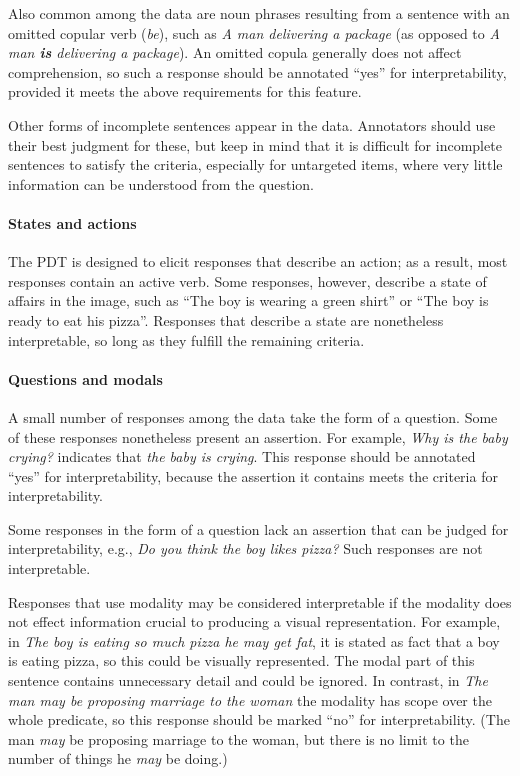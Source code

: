 \documentclass[12pt,notitlepage]{article}
\begin{document}
Also common among the data are noun phrases resulting from a sentence with an omitted copular verb (\textit{be}), such as \textit{A man delivering a package} (as opposed to \textit{A man \textbf{is} delivering a package}). An omitted copula generally does not affect comprehension, so such a response should be annotated ``yes'' for interpretability, provided it meets the above requirements for this feature.

Other forms of incomplete sentences appear in the data. Annotators should use their best judgment for these, but keep in mind that it is difficult for incomplete sentences to satisfy the criteria, especially for untargeted items, where very little information can be understood from the question.

\paragraph{States and actions} \label{para:interp-question} The PDT is designed to elicit responses that describe an action; as a result, most responses contain an active verb. Some responses, however, describe a state of affairs in the image, such as ``The boy is wearing a green shirt'' or ``The boy is ready to eat his pizza''. Responses that describe a state are nonetheless interpretable, so long as they fulfill the remaining criteria.

\paragraph{Questions and modals} \label{para:interp-question} A small number of responses among the data take the form of a question. Some of these responses nonetheless present an assertion. For example, \textit{Why is the baby crying?} indicates that \textit{the baby is crying}. This response should be annotated ``yes'' for interpretability, because the assertion it contains meets the criteria for interpretability.

Some responses in the form of a question lack an assertion that can be judged for interpretability, e.g., \textit{Do you think the boy likes pizza?} Such responses are not interpretable.

Responses that use modality may be considered interpretable if the modality does not effect information crucial to producing a visual representation. For example, in \textit{The boy is eating so much pizza he may get fat}, it is stated as fact that a boy is eating pizza, so this could be visually represented. The modal part of this sentence contains unnecessary detail and could be ignored. In contrast, in \textit{The man may be proposing marriage to the woman} the modality has scope over the whole predicate, so this response should be marked ``no'' for interpretability. (The man \textit{may} be proposing marriage to the woman, but there is no limit to the number of things he \textit{may} be doing.)
\end{document}
